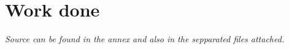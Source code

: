 \section{Work done}

\textit{Source can be found in the annex and also in the sepparated files attached.}